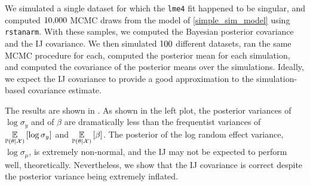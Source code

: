 


\SingularResultsGraph{}

We simulated a single dataset for which the \texttt{lme4} fit happened to be
singular, and computed $10{,}000$ MCMC draws from the model of
\eqref{simple_sim_model} using \texttt{rstanarm}.  With these samples, we
computed the Bayesian posterior covariance and the IJ covariance.  We then
simulated $100$ different datasets, ran the same MCMC procedure for
each, computed the posterior mean for each simulation, and computed the
covariance of the posterior means over the simulations.  Ideally, we expect the
IJ covariance to provide a good approximation to the simulation-based covariance
estimate.

The results are shown in .  As shown in the left plot,
the posterior variances of $\log \sigma_y$ and of $\beta$ are dramatically
less than the frequentist variances of $\underset{\mathbb{P}(\theta | {\mathcal{X}})}{\mathbb{E}}\left[\log \sigma_y\right]$ and
$\underset{\mathbb{P}(\theta | {\mathcal{X}})}{\mathbb{E}}\left[\beta\right]$.  The posterior of the log random effect variance, $\log
\sigma_\mu$, is extremely non-normal, and the IJ may not be expected to perform
well, theoretically.  Nevertheless, we show that the IJ covariance is correct
despite the posterior variance being extremely inflated.